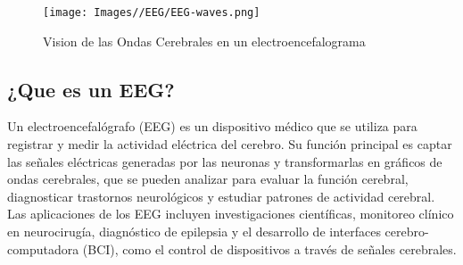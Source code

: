 \documentclass{article}
\begin{document}
\begin{figure}[H]
    \centering
    \texttt{[image: Images//EEG/EEG-waves.png]}
    \caption{Vision de las Ondas Cerebrales en un electroencefalograma}
    \label{fig:enter-label}
\end{figure}

\subsection{¿Que es un EEG?}
Un electroencefalógrafo (EEG) es un dispositivo médico que se utiliza para registrar y medir la actividad eléctrica del cerebro. Su función principal es captar las señales eléctricas generadas por las neuronas y transformarlas en gráficos de ondas cerebrales, que se pueden analizar para evaluar la función cerebral, diagnosticar trastornos neurológicos y estudiar patrones de actividad cerebral. Las aplicaciones de los EEG incluyen investigaciones científicas, monitoreo clínico en neurocirugía, diagnóstico de epilepsia y el desarrollo de interfaces cerebro-computadora (BCI), como el control de dispositivos a través de señales cerebrales.
\end{document}
